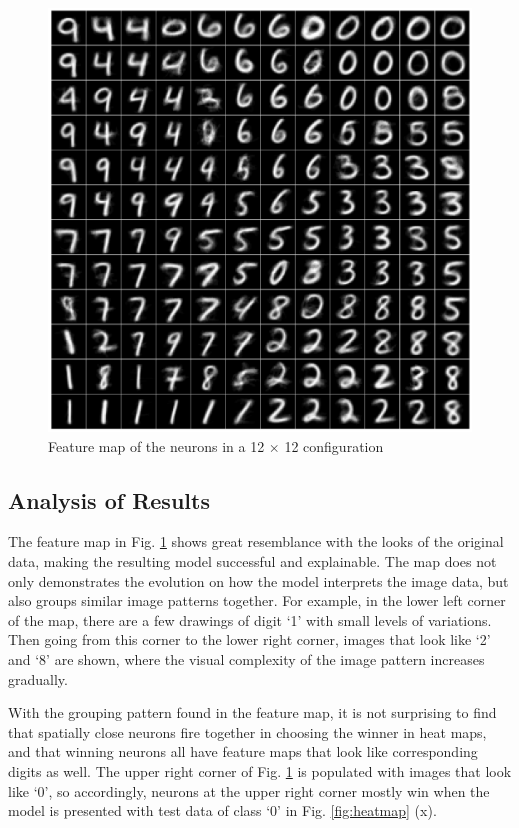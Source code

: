 \documentclass[11pt,titlepage]{article}
\begin{document}
\begin{figure}[H]
	\centering
	\includegraphics[width=\linewidth]{img/h5p1_feature}
	\caption{Feature map of the neurons in a 12 $\times$ 12 configuration}
	\label{fig:feature}
\end{figure}










\subsection{Analysis of Results}
The feature map in Fig. \ref{fig:feature} shows great resemblance with the looks of the original data, making the resulting model successful and explainable. The map does not only demonstrates the evolution on how the model interprets the image data, but also groups similar image patterns together. For example, in the lower left corner of the map, there are a few drawings of digit `1' with small levels of variations. Then going from this corner to the lower right corner, images that look like `2' and `8' are shown, where the visual complexity of the image pattern increases gradually.

With the grouping pattern found in the feature map, it is not surprising to find that spatially close neurons fire together in choosing the winner in heat maps, and that winning neurons all have feature maps that look like corresponding digits as well. The upper right corner of Fig. \ref{fig:feature} is populated with images that look like `0', so accordingly, neurons at the upper right corner mostly win when the model is presented with test data of class `0' in Fig. \ref{fig:heatmap} (x).  
\end{document}

